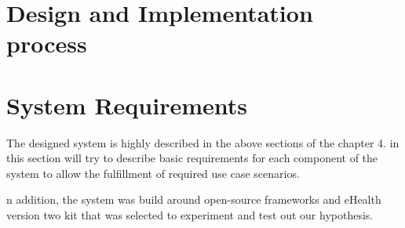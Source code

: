 \section{Design and Implementation process}


\section{System Requirements}

The designed system is highly described in the above sections of the chapter 4. in this section will try to describe basic requirements for each component of the system to allow the fulfillment of required use case scenarios.

n addition, the system was build around open-source frameworks and eHealth version two kit that was selected to experiment and test out our hypothesis.

